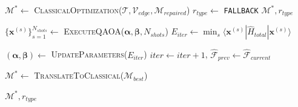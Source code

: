 \documentclass[lettersize,journal]{IEEEtran}
\begin{document}
\begin{algorithm}[t]
{{        
        \label{line:eq_classical_continue}
        $\mathcal{M}^* \leftarrow$ \textsc{ClassicalOptimization}($\mathcal{T}, \mathcal{V}_{edge}, \mathcal{M}_{repaired}$)\;
        \label{line:eq_fallback_type}
        $r_{type} \leftarrow$ \texttt{FALLBACK}\;
        \label{line:eq_fallback_return}
        \Return $\mathcal{M}^*, r_{type}$\;
    }
    
    \label{line:eq_circuit_exec}
    $\{\mathbf{x}^{(s)}\}_{s=1}^{N_{shots}} \leftarrow$ \textsc{ExecuteQAOA}($\boldsymbol{\alpha}, \boldsymbol{\beta}, N_{shots}$)\;
    \label{line:eq_best_update}
    $E_{iter} \leftarrow \min_{s} \langle \mathbf{x}^{(s)} | \hat{H}_{total} | \mathbf{x}^{(s)} \rangle$\;
    \label{line:eq_track_best}
    
    \label{line:eq_param_update}
    $(\boldsymbol{\alpha}, \boldsymbol{\beta}) \leftarrow$ \textsc{UpdateParameters}($E_{iter}$)\;
    \label{line:eq_iter_increment}
    $iter \leftarrow iter + 1$, $\hat{\mathcal{F}}_{prev} \leftarrow \hat{\mathcal{F}}_{current}$\;
}
\label{line:eq_loop_end}

\label{line:eq_extract_final}
$\mathcal{M}^* \leftarrow$ \textsc{TranslateToClassical}($\mathcal{M}_{best}$)\;
\label{line:eq_validate_qos}

\label{line:eq_final_return}
\Return $\mathcal{M}^*, r_{type}$\;
\end{algorithm}
\end{document}

